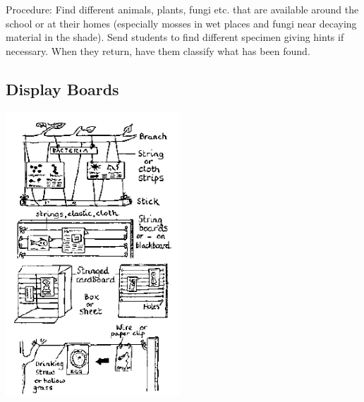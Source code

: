 \begin{multicols}{2}
\begin{description*}
\item[Procedure:]{Find different animals, plants, fungi etc. that are available around the school or at their homes (especially mosses in wet places and fungi near decaying material in the shade). Send students to find different specimen giving hints if necessary. When they return, have them classify what has been found.}
\end{description*}

\vfill
\columnbreak

\subsection{Display Boards}   %

\begin{center}
\includegraphics[width=0.49\textwidth]{./img/source/displays.png}
\end{center}


\end{multicols}
